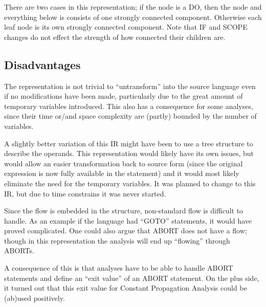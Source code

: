   There are two cases in this representation; if the node is a DO, then the node and
everything below is consists of one strongly connected component. Otherwise each leaf
node is its own strongly connected component. Note that IF and SCOPE changes do not
effect the strength of how connected their children are.

\subsection{Disadvantages}
The representation is not trivial to ``untransform'' into the source language even if no
modifications have been made, particularly due to the great amount of temporary variables
introduced. This also has a consequence for some analyses, since their time
or/and space complexity are (partly) bounded by the number of variables.

  A slightly better variation of this IR might have been to use a tree structure to
describe the operands. This representation would likely have its own issues, but would
allow an easier transformation back to source form (since the original expression is now
fully available in the statement) and it would most likely eliminate the need for the
temporary variables. It was planned to change to this IR, but due to time constrains
it was never started.

\docpar
Since the flow is embedded in the structure, non-standard flow is difficult to handle.
As an example if the language had  ``GOTO'' statements, it would have proved complicated.
One could also argue that ABORT does not have a flow; though in this representation the
analysis will end up ``flowing'' through ABORTs.

  A consequence of this is that analyses have to be able to handle ABORT statements and
define an ``exit value'' of an ABORT statement. On the plus side, it turned out that this
exit value for Constant Propagation Analysis could be (ab)used positively.

